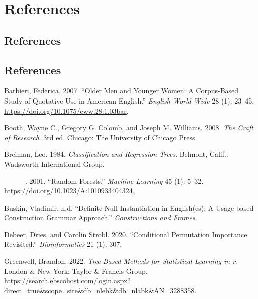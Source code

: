 \documentclass[
  11pt,
  letterpaper,
  DIV=11,
  numbers=noendperiod]{scrreprt}
\newlength{\cslhangindent}
\newenvironment{CSLReferences}[2] %
 {\begin{list}{}{%
  \setlength{\itemindent}{0pt}
  \setlength{\leftmargin}{0pt}
  \setlength{\parsep}{0pt}
  \ifodd #1
   \setlength{\leftmargin}{\cslhangindent}
   \setlength{\itemindent}{-1\cslhangindent}
  \fi
  \setlength{\itemsep}{#2\baselineskip}}}
 {\end{list}}
\begin{document}
\part{References}

\chapter{References}\label{references-2}

\chapter*{References}\label{references-3}


\label{refs}
\begin{CSLReferences}{1}{0}
Barbieri, Federica. 2007. {``Older Men and Younger Women: A Corpus-Based
Study of Quotative Use in American English.''} \emph{English World-Wide}
28 (1): 23--45. \url{https://doi.org/10.1075/eww.28.1.03bar}.

Booth, Wayne C., Gregory G. Colomb, and Joseph M. Williams. 2008.
\emph{The Craft of Research}. 3rd ed. Chicago: The University of Chicago
Press.

Breiman, Leo. 1984. \emph{Classification and Regression Trees}. Belmont,
Calif.: Wadsworth International Group.

---------. 2001. {``Random Forests.''} \emph{Machine Learning} 45 (1):
5--32. \url{https://doi.org/10.1023/A:1010933404324}.

Buskin, Vladimir. n.d. {``Definite {Null Instantiation} in
{English}(es): {A Usage-based Construction Grammar Approach}.''}
\emph{Constructions and Frames}.

Debeer, Dries, and Carolin Strobl. 2020. {``Conditional Permutation
Importance Revisited.''} \emph{Bioinformatics} 21 (1): 307.

Greenwell, Brandon. 2022. \emph{Tree-Based Methods for Statistical
Learning in r}. London \& New York: Taylor \& Francis Group.
\url{https://search.ebscohost.com/login.aspx?direct=true&scope=site&db=nlebk&db=nlabk&AN=3288358}.


\end{CSLReferences}
\end{document}
